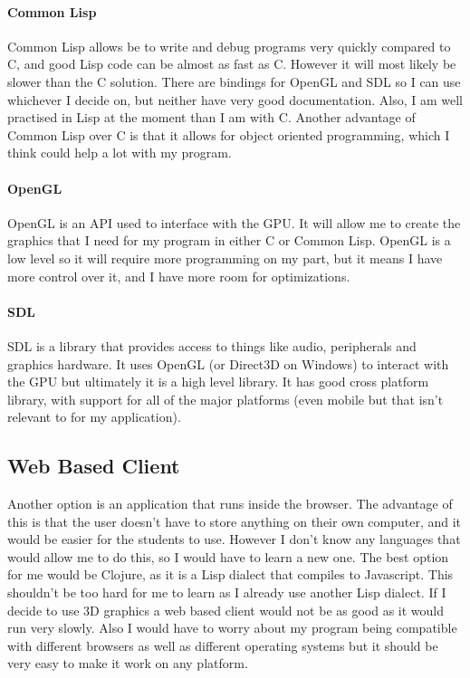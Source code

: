 \paragraph{Common Lisp} 
Common Lisp allows be to write and debug programs very quickly compared to C,
and good Lisp code can be almost as fast as C. However it will most likely be
slower than the C solution. There are bindings for OpenGL and SDL so I can use
whichever I decide on, but neither have very good documentation. Also, I am well
practised in Lisp at the moment than I am with C. Another advantage of Common
Lisp over C is that it allows for object oriented programming, which I think
could help a lot with my program.

\paragraph{OpenGL}
OpenGL is an API used to interface with the GPU\@. It will allow me to create
the graphics that I need for my program in either C or Common Lisp. OpenGL is a
low level so it will require more programming on my part, but it means I have
more control over it, and I have more room for optimizations.

\paragraph{SDL}
SDL is a library that provides access to things like audio, peripherals and
graphics hardware. It uses OpenGL (or Direct3D on Windows) to interact with the
GPU but ultimately it is a high level library. It has good cross platform
library, with support for all of the major platforms (even mobile but that isn't
relevant to for my application).

\subsection{Web Based Client}
Another option is an application that runs inside the browser. The advantage of
this is that the user doesn't have to store anything on their own computer, and
it would be easier for the students to use. However I don't know any languages
that would allow me to do this, so I would have to learn a new one. The best
option for me would be Clojure, as it is a Lisp dialect that compiles to
Javascript. This shouldn't be too hard for me to learn as I already use another
Lisp dialect. If I decide to use 3D graphics a web based client would not be as
good as it would run very slowly. Also I would have to worry about my program
being compatible with different browsers as well as different operating systems
but it should be very easy to make it work on any platform. 

